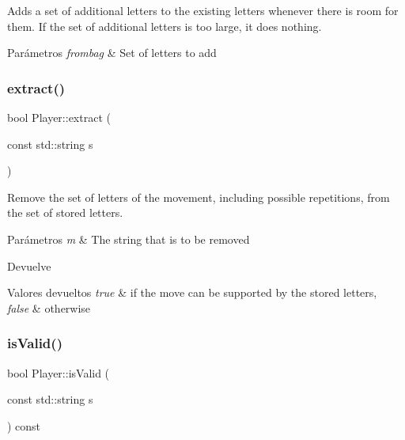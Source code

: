 Adds a set of additional letters to the existing letters whenever there is room for them. If the set of additional letters is too large, it does nothing. 


\begin{DoxyParams}{Parámetros}
{\em frombag} & Set of letters to add \\
\hline
\end{DoxyParams}
\mbox{\label{classPlayer_af5cf742e076aa1e467272d66cd3e96ee}} 
\subsubsection{\texorpdfstring{extract()}{extract()}}
{\footnotesize\ttfamily bool Player\+::extract (\begin{DoxyParamCaption}\item[{const std\+::string}]{s }\end{DoxyParamCaption})}



Remove the set of letters of the movement, including possible repetitions, from the set of stored letters. 


\begin{DoxyParams}{Parámetros}
{\em m} & The string that is to be removed \\
\hline
\end{DoxyParams}
\begin{DoxyReturn}{Devuelve}

\end{DoxyReturn}

\begin{DoxyRetVals}{Valores devueltos}
{\em true} & if the move can be supported by the stored letters, \\
\hline
{\em false} & otherwise \\
\hline
\end{DoxyRetVals}
\mbox{\label{classPlayer_a77e7a96403c899054e633eb88c2997c5}} 
\subsubsection{\texorpdfstring{is\+Valid()}{isValid()}}
{\footnotesize\ttfamily bool Player\+::is\+Valid (\begin{DoxyParamCaption}\item[{const std\+::string}]{s }\end{DoxyParamCaption}) const}



